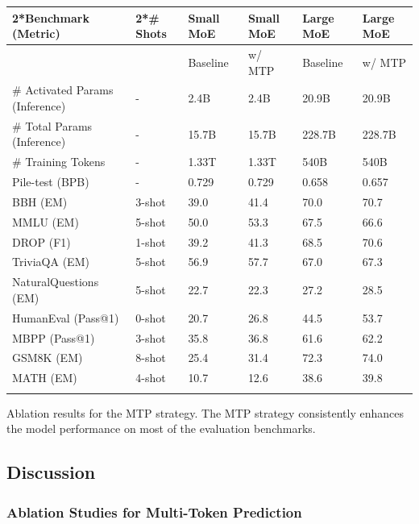 \documentclass[11pt,a4paper]{article}
\begin{document}
\begin{table}[h]
\begin{tabular}{|l|l|l|l|l|l|}
\hline
2*Benchmark (Metric) & 2*\# Shots & Small MoE & Small MoE & Large MoE & Large MoE \\ \hline
 &  & Baseline & w/ MTP & Baseline & w/ MTP \\ \hline
\# Activated Params (Inference) & - & 2.4B & 2.4B & 20.9B & 20.9B \\ \hline
\# Total Params (Inference) & - & 15.7B & 15.7B & 228.7B & 228.7B \\ \hline
\# Training Tokens & - & 1.33T & 1.33T & 540B & 540B \\ \hline
Pile-test (BPB) & - & 0.729 & 0.729 & 0.658 & 0.657 \\ \hline
BBH (EM) & 3-shot & 39.0 & 41.4 & 70.0 & 70.7 \\ \hline
MMLU (EM) & 5-shot & 50.0 & 53.3 & 67.5 & 66.6 \\ \hline
DROP (F1) & 1-shot & 39.2 & 41.3 & 68.5 & 70.6 \\ \hline
TriviaQA (EM) & 5-shot & 56.9 & 57.7 & 67.0 & 67.3 \\ \hline
NaturalQuestions (EM) & 5-shot & 22.7 & 22.3 & 27.2 & 28.5 \\ \hline
HumanEval (Pass@1) & 0-shot & 20.7 & 26.8 & 44.5 & 53.7 \\ \hline
MBPP (Pass@1) & 3-shot & 35.8 & 36.8 & 61.6 & 62.2 \\ \hline
GSM8K (EM) & 8-shot & 25.4 & 31.4 & 72.3 & 74.0 \\ \hline
MATH (EM) & 4-shot & 10.7 & 12.6 & 38.6 & 39.8 \\ \hline
 &  &  &  &  &  \\ \hline
\end{tabular}
\end{table}

Ablation results for the MTP strategy. 
 The MTP strategy consistently enhances the model performance on most of the evaluation benchmarks.

\subsection{Discussion}

\subsubsection{Ablation Studies for Multi-Token Prediction}
\end{document}
